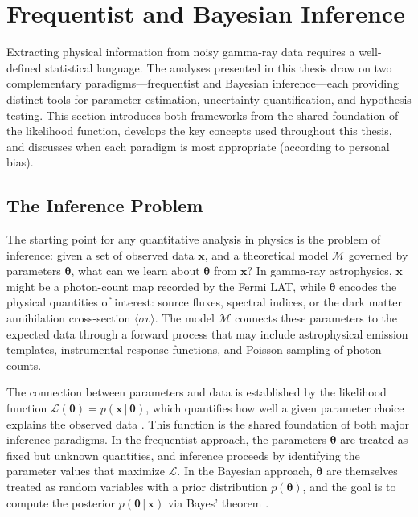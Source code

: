 \section{Frequentist and Bayesian Inference}
\label{sec:3.1}

Extracting physical information from noisy gamma-ray data requires a well-defined statistical language.
The analyses presented in this thesis draw on two complementary paradigms---frequentist and Bayesian inference---each providing distinct tools for parameter estimation, uncertainty quantification, and hypothesis testing.
This section introduces both frameworks from the shared foundation of the likelihood function, develops the key concepts used throughout this thesis, and discusses when each paradigm is most appropriate (according to personal bias).


\subsection{The Inference Problem}
\label{sec:3.1.1}

The starting point for any quantitative analysis in physics is the problem of inference: given a set of observed data $\mathbf{x}$, and a theoretical model $\mathcal{M}$ governed by parameters $\boldsymbol{\theta}$, what can we learn about $\boldsymbol{\theta}$ from $\mathbf{x}$?
In gamma-ray astrophysics, $\mathbf{x}$ might be a photon-count map recorded by the Fermi LAT, while $\boldsymbol{\theta}$ encodes the physical quantities of interest: source fluxes, spectral indices, or the dark matter annihilation cross-section $\langle \sigma v \rangle$.
The model $\mathcal{M}$ connects these parameters to the expected data through a forward process that may include astrophysical emission templates, instrumental response functions, and Poisson sampling of photon counts.

The connection between parameters and data is established by the likelihood function $\mathcal{L}(\boldsymbol{\theta}) = p(\mathbf{x} \,|\, \boldsymbol{\theta})$, which quantifies how well a given parameter choice explains the observed data \cite{Cranmer:2020}.
This function is the shared foundation of both major inference paradigms.
In the frequentist approach, the parameters $\boldsymbol{\theta}$ are treated as fixed but unknown quantities, and inference proceeds by identifying the parameter values that maximize $\mathcal{L}$.
In the Bayesian approach, $\boldsymbol{\theta}$ are themselves treated as random variables with a prior distribution $p(\boldsymbol{\theta})$, and the goal is to compute the posterior $p(\boldsymbol{\theta} \,|\, \mathbf{x})$ via Bayes' theorem \cite{bishop,Hastie:2009}.

